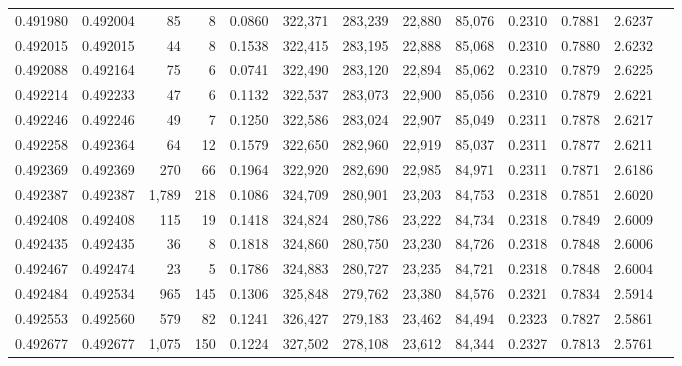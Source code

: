 \begin{tabular}{rrrrrrrrrrrrr}
0.491980 & 0.492004 &    85 &     8 &                                     0.0860 & 322,371 & 283,239 &  22,880 &  85,076 & 0.2310 & 0.7881 & 2.6237 \\
0.492015 & 0.492015 &    44 &     8 &                                     0.1538 & 322,415 & 283,195 &  22,888 &  85,068 & 0.2310 & 0.7880 & 2.6232 \\
0.492088 & 0.492164 &    75 &     6 &                                     0.0741 & 322,490 & 283,120 &  22,894 &  85,062 & 0.2310 & 0.7879 & 2.6225 \\
0.492214 & 0.492233 &    47 &     6 &                                     0.1132 & 322,537 & 283,073 &  22,900 &  85,056 & 0.2310 & 0.7879 & 2.6221 \\
0.492246 & 0.492246 &    49 &     7 &                                     0.1250 & 322,586 & 283,024 &  22,907 &  85,049 & 0.2311 & 0.7878 & 2.6217 \\
0.492258 & 0.492364 &    64 &    12 &                                     0.1579 & 322,650 & 282,960 &  22,919 &  85,037 & 0.2311 & 0.7877 & 2.6211 \\
0.492369 & 0.492369 &   270 &    66 &                                     0.1964 & 322,920 & 282,690 &  22,985 &  84,971 & 0.2311 & 0.7871 & 2.6186 \\
0.492387 & 0.492387 & 1,789 &   218 &                                     0.1086 & 324,709 & 280,901 &  23,203 &  84,753 & 0.2318 & 0.7851 & 2.6020 \\
0.492408 & 0.492408 &   115 &    19 &                                     0.1418 & 324,824 & 280,786 &  23,222 &  84,734 & 0.2318 & 0.7849 & 2.6009 \\
0.492435 & 0.492435 &    36 &     8 &                                     0.1818 & 324,860 & 280,750 &  23,230 &  84,726 & 0.2318 & 0.7848 & 2.6006 \\
0.492467 & 0.492474 &    23 &     5 &                                     0.1786 & 324,883 & 280,727 &  23,235 &  84,721 & 0.2318 & 0.7848 & 2.6004 \\
0.492484 & 0.492534 &   965 &   145 &                                     0.1306 & 325,848 & 279,762 &  23,380 &  84,576 & 0.2321 & 0.7834 & 2.5914 \\
0.492553 & 0.492560 &   579 &    82 &                                     0.1241 & 326,427 & 279,183 &  23,462 &  84,494 & 0.2323 & 0.7827 & 2.5861 \\
0.492677 & 0.492677 & 1,075 &   150 &                                     0.1224 & 327,502 & 278,108 &  23,612 &  84,344 & 0.2327 & 0.7813 & 2.5761 \\

\end{tabular}
